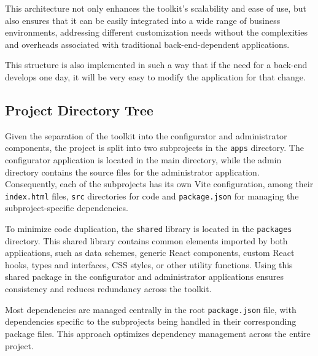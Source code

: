 This architecture not only enhances the toolkit's scalability and ease of use, but also ensures that it can be easily integrated into a wide range of business environments, addressing different customization needs without the complexities and overheads associated with traditional back-end-dependent applications.

This structure is also implemented in such a way that if the need for a back-end develops one day, it will be very easy to modify the application for that change.

\subsection{Project Directory Tree}

\vspace{16pt}

Given the separation of the toolkit into the configurator and administrator components, the project is split into two subprojects in the \texttt{apps} directory. The configurator application is located in the main directory, while the admin directory contains the source files for the administrator application. Consequently, each of the subprojects has its own Vite configuration, among their \texttt{index.html} files, \texttt{src} directories for code and \texttt{package.json} for managing the subproject-specific dependencies. 

To minimize code duplication, the \texttt{shared} library is located in the \texttt{packages} directory. This shared library contains common elements imported by both applications, such as data schemes, generic React components, custom React hooks, types and interfaces, CSS styles, or other utility functions. Using this shared package in the configurator and administrator applications ensures consistency and reduces redundancy across the toolkit.

Most dependencies are managed centrally in the root \texttt{package.json} file, with dependencies specific to the subprojects being handled in their corresponding package files. This approach optimizes dependency management across the entire project.

